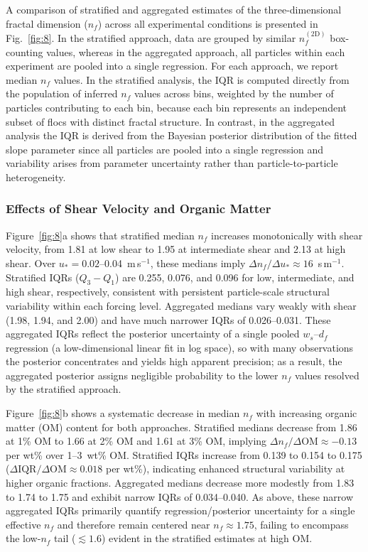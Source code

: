 \documentclass{agujournal2019}
\providecommand{\DIFadd}[1]{{\protect\color{blue}#1}}
\begin{document}
A comparison of stratified and aggregated estimates of the three-dimensional fractal dimension (\(n_f\)) across all experimental conditions is presented in Fig.~\ref{fig:8}. In the stratified approach, data are grouped by similar \(n_f^{(2\mathrm{D})}\) box-counting values, whereas in the aggregated approach, all particles within each experiment are pooled into a single regression. For each approach, we report median \(n_f\) values. \DIFadd{In the stratified analysis, the IQR is computed directly from the population of inferred $n_f$ values across bins, weighted by the number of particles contributing to each bin, because each bin represents an independent subset of flocs with distinct fractal structure. In contrast, in the aggregated analysis the IQR is derived from the Bayesian posterior distribution of the fitted slope parameter since all particles are pooled into a single regression and variability arises from parameter uncertainty rather than particle-to-particle heterogeneity.}

\DIFadd{\subsubsection{Effects of Shear Velocity and Organic Matter}}

Figure~\ref{fig:8}a shows that stratified median \(n_f\) increases monotonically with shear velocity, from 1.81 at low shear to 1.95 at intermediate shear and 2.13 at high shear. Over \(u_\ast=0.02\)--0.04~m\,s$^{-1}$, these medians imply \(\Delta n_f/\Delta u_\ast \approx 16\)~s\,m$^{-1}$. Stratified IQRs (\(Q_3-Q_1\)) are 0.255, 0.076, and 0.096 for low, intermediate, and high shear, respectively, consistent with persistent particle-scale structural variability within each forcing level. Aggregated medians vary weakly with shear (1.98, 1.94, and 2.00) and have much narrower IQRs of 0.026--0.031. \DIFadd{These aggregated IQRs reflect the posterior uncertainty of a single pooled $w_s$--$d_f$ regression (a low-dimensional linear fit in log space), so with many observations the posterior concentrates and yields high apparent precision; as a result, the aggregated posterior assigns negligible probability to the lower $n_f$ values resolved by the stratified approach.}

Figure~\ref{fig:8}b shows a systematic decrease in median \(n_f\) with increasing organic matter (OM) content for both approaches. Stratified medians decrease from 1.86 at 1\% OM to 1.66 at 2\% OM and 1.61 at 3\% OM, implying \(\Delta n_f/\Delta\mathrm{OM}\approx-0.13\) per wt\% over 1--3~wt\% OM. Stratified IQRs increase from 0.139 to 0.154 to 0.175 (\(\Delta\mathrm{IQR}/\Delta\mathrm{OM}\approx 0.018\) per wt\%), indicating enhanced structural variability at higher organic fractions. Aggregated medians decrease more modestly from 1.83 to 1.74 to 1.75 and exhibit narrow IQRs of 0.034--0.040. \DIFadd{As above, these narrow aggregated IQRs primarily quantify regression/posterior uncertainty for a single effective $n_f$ and therefore remain centered near $n_f\approx 1.75$, failing to encompass the low-$n_f$ tail (\(\lesssim 1.6\)) evident in the stratified estimates at high OM.}
\end{document}
